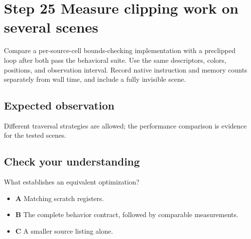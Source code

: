 \section{Step 25 Measure clipping work on several scenes}\label{blit-s25}

Compare a per-source-cell bounds-checking implementation with a preclipped loop after both pass the behavioral suite. Use the same descriptors, colors, positions, and observation interval. Record native instruction and memory counts separately from wall time, and include a fully invisible scene.


\subsection{Expected observation}
Different traversal strategies are allowed; the performance comparison is evidence for the tested scenes.

\subsection{Check your understanding}
What establishes an equivalent optimization?

\begin{itemize}
  \item \textbf{A} Matching scratch registers.
  \item \textbf{B} The complete behavior contract, followed by comparable measurements.
  \item \textbf{C} A smaller source listing alone.
\end{itemize}

